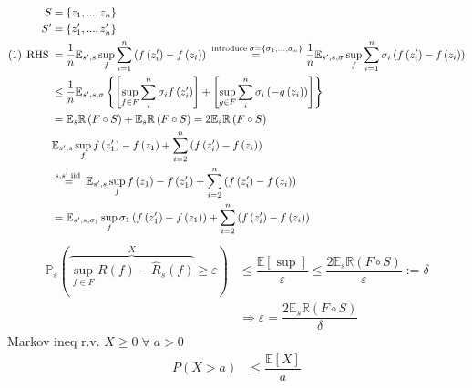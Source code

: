 \documentclass{article}
\begin{document}
\begin{align*}
S  &= \left\{z_{1}, ..., z_{n}\right\}
\\ S' &= \left\{z'_{1}, ..., z'_{n}\right\}
\\ \left(1\right) \text{\;RHS\;} &= \dfrac{1}{n} \mathbb{E}_{s', s} \displaystyle\sup_{f} \displaystyle\sum_{i=1}^{n} \left(f\left(z'_{i}\right) - f\left(z_{i}\right)\right) \stackrel{\text{\;introduce\;} \sigma = \left\{\sigma_{1}, ..., \sigma_{n}\right\}}{=} \dfrac{1}{n} \mathbb{E}_{s', s, \sigma} \displaystyle\sup_{f} \displaystyle\sum_{i=1}^{n} \sigma_{i} \left(f\left(z'_{i}\right) - f\left(z_{i}\right)\right)
\\ &\leq  \dfrac{1}{n} \mathbb{E}_{s', s, \sigma}\left\{\left[\displaystyle\sup_{f \in F} \displaystyle\sum_{i}^{n} \sigma_{i} f\left(z'_{i}\right)\right] + \left[\displaystyle\sup_{g \in F} \displaystyle\sum_{i}^{n} \sigma_{i} \left(-g\left(z_{i}\right)\right)\right]\right\}
\\ &= \mathbb{E}_{s} \mathbb{R}\left(F \circ S\right) + \mathbb{E}_{s} \mathbb{R}\left(F \circ S\right) = 2 \mathbb{E}_{s} \mathbb{R}\left(F \circ S\right)
\\ &  \mathbb{E}_{s', s} \displaystyle\sup_{f} f\left(z'_{1}\right) - f\left(z_{1}\right) + \displaystyle\sum_{i=2}^{n} \left(f\left(z'_{i}\right) - f\left(z_{i}\right)\right)
\\ &\stackrel{s, s' \text{\;iid\;}}{=} \mathbb{E}_{s', s} \displaystyle\sup_{f} f\left(z_{1}\right) - f\left(z'_{1}\right) + \displaystyle\sum_{i=2}^{n} \left(f\left(z'_{i}\right) - f\left(z_{i}\right)\right)
\\ &= \mathbb{E}_{s', s, \sigma_{1}} \displaystyle\sup_{f} \sigma_{1}\left(f\left(z'_{1}\right) - f\left(z_{1}\right)\right) + \displaystyle\sum_{i=2}^{n} \left(f\left(z'_{i}\right) - f\left(z_{i}\right)\right)
\end{align*}
\begin{align*}
\mathbb{P}_{s}\left(\overbrace{\displaystyle\sup_{f \in F} R\left(f\right) - \hat{R}_{s}\left(f\right)}^{X } \geq  \varepsilon\right) &\leq  \dfrac{\mathbb{E}\left[\displaystyle\sup\right]}{\varepsilon} \leq  \dfrac{2 \mathbb{E}_{s} \mathbb{R}\left(F \circ S\right)}{\varepsilon} := \delta
\\ &\Rightarrow  \varepsilon = \dfrac{2 \mathbb{E}_{s} \mathbb{R}\left(F \circ S\right)}{\delta}
\end{align*}
Markov ineq r.v. $\boxed{X  \geq  0} \;\forall\; a > 0$
\begin{align*}
P\left(X > a\right)  &\leq  \dfrac{\mathbb{E}\left[X\right]}{a}
\end{align*}
\end{document}
